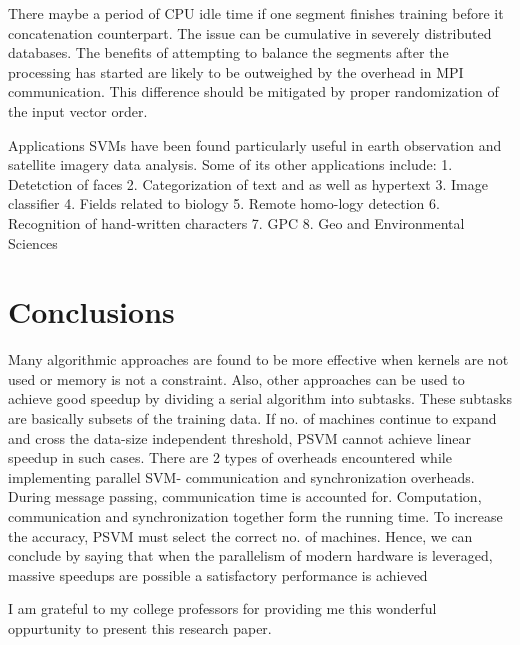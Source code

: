 \documentclass[aps,floatfix,prd,showpacs]{revtex4}
\begin{document}
There maybe a period of CPU idle time if one segment finishes training before it concatenation counterpart. The issue can be cumulative in severely distributed databases. The benefits of attempting to balance the segments after the processing has started are likely to be outweighed by the overhead in MPI communication. This difference should be mitigated by proper randomization of the input vector order. 
 
Applications SVMs have been found particularly useful in earth observation and satellite imagery data analysis. Some of its other applications include: 1. Detetction of faces 2. Categorization of text and as well as hypertext 3. Image classifier 4. Fields related to biology 5. Remote homo-logy detection 6. Recognition of hand-written characters 7. GPC 8. Geo and Environmental Sciences 

\section{Conclusions}

Many algorithmic approaches are found to be more effective when kernels are not used or memory is not a constraint. Also, other approaches can be used to achieve good speedup by dividing a serial algorithm into subtasks. These subtasks are basically subsets of the training data. If no. of machines continue to expand and cross the data-size independent threshold, PSVM cannot achieve linear speedup in such cases. There are 2 types of overheads encountered while implementing parallel SVM- communication and synchronization overheads. During message passing, communication time is accounted for.  Computation, communication and synchronization together form the running time. To increase the accuracy, PSVM must select the correct no. of machines.  Hence, we can conclude by saying that when the parallelism of modern hardware is leveraged, massive speedups are possible a satisfactory performance is achieved

\acknowledgments
I am grateful to my college professors for providing me this wonderful oppurtunity to present this research paper.
\end{document}

